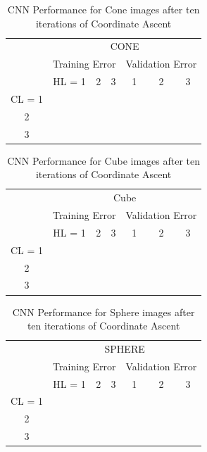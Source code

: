\documentclass[journal]{IEEEtran}
\begin{document}
\begin{table}[h]
	\caption{CNN Performance for Cone images after ten iterations of Coordinate Ascent}
	\label{CNN_CONE_TABLE}
	\centering
	\begin{tabular}{|c|c|c|c||c|c|c|}
		\cline{2-7}
		\multicolumn{1}{c|}{} &	\multicolumn{6}{c|}{CONE}\\\cline{2-7}
		\multicolumn{1}{c|}{}&\multicolumn{3}{|c||}{Training Error}  &\multicolumn{3}{c|}{Validation Error} \\
		\cline{2-7}
		\multicolumn{1}{c|}{} & HL = 1 & 2 & 3 &1 & 2 & 3 \\
		\hline
		CL = 1	& & & 	& & & \\
		2	& & & & & & \\
		3	& & & & &  & \\
		\hline
		
		
	\end{tabular}
\end{table}

\begin{table}[h]
	\caption{CNN Performance for Cube images after ten iterations of Coordinate Ascent}
	\label{CNN_CUBE_TABLE}
	\centering
	\begin{tabular}{|c|c|c|c||c|c|c|}
		\cline{2-7}
		\multicolumn{1}{c|}{} &	\multicolumn{6}{c|}{Cube}\\\cline{2-7}
		\multicolumn{1}{c|}{}&\multicolumn{3}{|c||}{Training Error}  &\multicolumn{3}{c|}{Validation Error} \\
		\cline{2-7}
		\multicolumn{1}{c|}{} & HL = 1 & 2 & 3 &1 & 2 & 3 \\
		\hline
		CL = 1	& & & 	& & & \\
		2	& & & & & & \\
		3	& & & & &  & \\
		\hline
		
		
	\end{tabular}
\end{table}


\begin{table}[h]
	\caption{CNN Performance for Sphere images after ten iterations of Coordinate Ascent}
	\label{CNN_SPHERE_TABLE}
	\centering
	\begin{tabular}{|c|c|c|c||c|c|c|}
		\cline{2-7}
		\multicolumn{1}{c|}{} &	\multicolumn{6}{c|}{SPHERE}\\\cline{2-7}
		\multicolumn{1}{c|}{}&\multicolumn{3}{|c||}{Training Error}  &\multicolumn{3}{c|}{Validation Error} \\
		\cline{2-7}
		\multicolumn{1}{c|}{} & HL = 1 & 2 & 3 &1 & 2 & 3 \\
		\hline
		CL = 1	& & & 	& & & \\
		2	& & & & & & \\
		3	& & & & &  & \\
		\hline
		
		
	\end{tabular}
\end{table}
\end{document}
